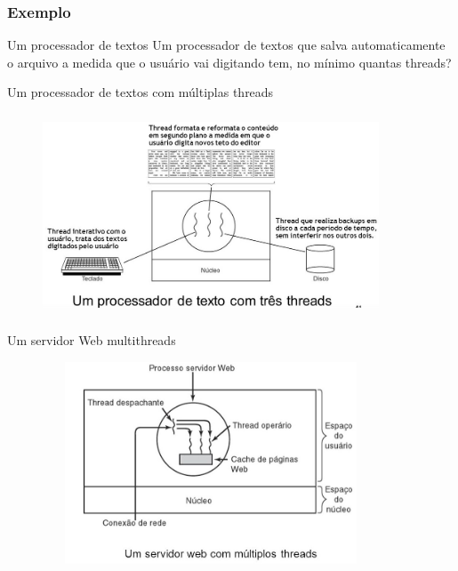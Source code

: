 \documentclass[11pt]{beamer}
\begin{document}
\begin{frame}\frametitle{ Exemplo}
\begin{block}{Um processador de textos}
 Um processador de textos que salva automaticamente o arquivo a medida que o usuário vai digitando tem, no mínimo quantas threads?
\end{block}

\end{frame}

\begin{frame}{Um processador de textos com múltiplas threads}
\begin{figure}[h]

\includegraphics[width=100mm, height=60mm]{Figuras/threadsTexto.jpg}

\end{figure}
\end{frame}



\begin{frame}{ Um servidor Web multithreads}
\begin{figure}[h]

\includegraphics[width=100mm, height=60mm]{Figuras/threadsServidor.jpg}
\end{figure}

\end{frame}
\end{document}
